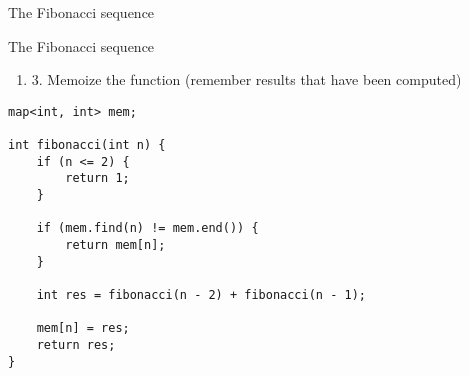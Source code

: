 \documentclass[12pt,t]{beamer}
\newcommand{\be}{\begin{enumerate}}
\newcommand{\ee}{\end{enumerate}}
\begin{document}
\begin{frame}[fragile]{The Fibonacci sequence}
\begin{figure}
% 
            \end{figure}

\end{frame}

\begin{frame}[fragile]{The Fibonacci sequence}
    \be
        \item[3.] Memoize the function (remember results that have been computed)
    \ee

    \vspace{5pt}

    \begin{verbatim}
map<int, int> mem;

int fibonacci(int n) {
    if (n <= 2) {
        return 1;
    }

    if (mem.find(n) != mem.end()) {
        return mem[n];
    }

    int res = fibonacci(n - 2) + fibonacci(n - 1);

    mem[n] = res;
    return res;
}
    \end{verbatim}

\end{frame}
\end{document}
